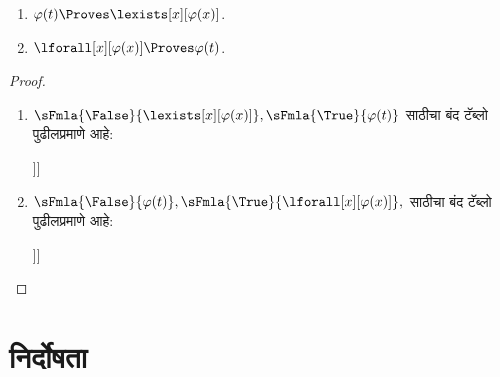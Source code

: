 \begin{prop}
\label{fol:tab:qpr:prop:provability-quantifiers}
\begin{enumerate}
\item $\varphi(t) \Proves \lexists[x][\varphi(x)]$.
\item $\lforall[x][\varphi(x)] \Proves \varphi(t)$.
\end{enumerate}
\end{prop}

\begin{proof}
\begin{enumerate}
\item
  $\sFmla{\False}{\lexists[x][\varphi(x)]}, \sFmla{\True}{\varphi(t)}$ साठीचा बंद
  टॅब्लो पुढीलप्रमाणे आहे:
  \begin{oltableau}
    [\sFmla{\False}{\lexists[x][\varphi(x)]}, just = \TAss
      [\sFmla{\True}{\varphi(t)}, just = \TAss
        [\sFmla{\False}{\varphi(t)}, just = {\TRule{\False}{\lexists}[1]}, close]]]
    \end{oltableau}
\item
  $\sFmla{\False}{\varphi(t)}, \sFmla{\True}{\lforall[x][\varphi(x)]}, $
  साठीचा बंद टॅब्लो पुढीलप्रमाणे आहे:
  \begin{oltableau}
    [\sFmla{\False}{\varphi(t)}, just = \TAss
      [\sFmla{\True}{\lforall[x][\varphi(x)]}, just = \TAss
        [\sFmla{\True}{\varphi(t)}, just = {\TRule{\True}{\lforall}[2]}, close]]]
    \end{oltableau}
\end{enumerate}
\end{proof}












\section{निर्दोषता}\label{fol:tab:sou:sec}

